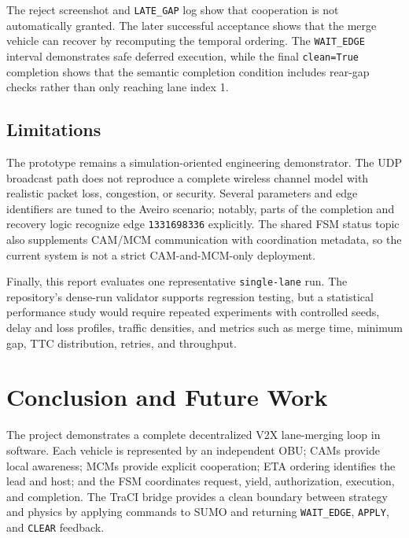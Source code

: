\documentclass[a4paper,12pt]{article}
\begin{document}
The reject screenshot and \texttt{LATE\_GAP} log show that cooperation is not automatically granted. The later successful acceptance shows that the merge vehicle can recover by recomputing the temporal ordering. The \texttt{WAIT\_EDGE} interval demonstrates safe deferred execution, while the final \texttt{clean=True} completion shows that the semantic completion condition includes rear-gap checks rather than only reaching lane index 1.

\subsection{Limitations}

The prototype remains a simulation-oriented engineering demonstrator. The UDP broadcast path does not reproduce a complete wireless channel model with realistic packet loss, congestion, or security. Several parameters and edge identifiers are tuned to the Aveiro scenario; notably, parts of the completion and recovery logic recognize edge \texttt{1331698336} explicitly. The shared FSM status topic also supplements CAM/MCM communication with coordination metadata, so the current system is not a strict CAM-and-MCM-only deployment.

Finally, this report evaluates one representative \texttt{single-lane} run. The repository's dense-run validator supports regression testing, but a statistical performance study would require repeated experiments with controlled seeds, delay and loss profiles, traffic densities, and metrics such as merge time, minimum gap, TTC distribution, retries, and throughput.

\section{Conclusion and Future Work}

The project demonstrates a complete decentralized V2X lane-merging loop in software. Each vehicle is represented by an independent OBU; CAMs provide local awareness; MCMs provide explicit cooperation; ETA ordering identifies the lead and host; and the FSM coordinates request, yield, authorization, execution, and completion. The TraCI bridge provides a clean boundary between strategy and physics by applying commands to SUMO and returning \texttt{WAIT\_EDGE}, \texttt{APPLY}, and \texttt{CLEAR} feedback.
\end{document}
